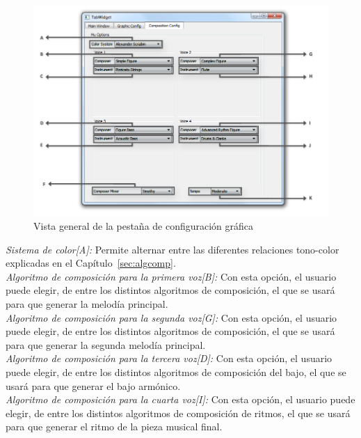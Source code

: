 		\begin{figure}[htbp]
		\centering
		\hspace*{-0.9in}
		\includegraphics[scale=0.57]{graphics/interfazcomp.png}
		\caption{Vista general de la pestaña de configuración gráfica}
		\label{fig:interfazcomp}
		\end{figure}
		
		\noindent\textit{Sistema de color[A]:} Permite alternar entre las diferentes relaciones tono-color explicadas en el Capítulo~\ref{sec:algcomp}.\\
		
		\noindent\textit{Algoritmo de composición para la primera voz[B]:} Con esta opción, el usuario puede elegir, de entre los distintos algoritmos de composición, el que se usará para que generar la melodía principal.\\
		
		\noindent\textit{Algoritmo de composición para la segunda voz[G]:} Con esta opción, el usuario puede elegir, de entre los distintos algoritmos de composición, el que se usará para que generar la segunda melodía principal.\\

		\noindent\textit{Algoritmo de composición para la tercera voz[D]:} Con esta opción, el usuario puede elegir, de entre los distintos algoritmos de composición del bajo, el que se usará para que generar el bajo armónico.\\
		
		\noindent\textit{Algoritmo de composición para la cuarta voz[I]:} Con esta opción, el usuario puede elegir, de entre los distintos algoritmos de composición de ritmos, el que se usará para que generar el ritmo de la pieza musical final.\\
		
